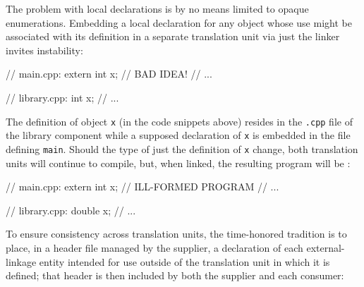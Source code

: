 The problem with local declarations is by no means limited to opaque
enumerations. Embedding a local declaration for any object whose use
might be associated with its definition in a separate translation unit
via just the linker invites instability:

\noindent\begin{minipage}{.45\textwidth}
\begin{emcppslisting}
// main.cpp:
extern int x;  // BAD IDEA!
// ...
\end{emcppslisting}
\end{minipage}\hfill
\begin{minipage}{.45\textwidth}
\begin{emcppslisting}
// library.cpp:
int x;
// ...
\end{emcppslisting}
\end{minipage}

\noindent The definition of object \lstinline!x! (in the code snippets above) resides
in the \lstinline!.cpp! file of the library component while a supposed
declaration of \lstinline!x! is embedded in the file defining
\lstinline!main!. Should the type of just the definition of \lstinline!x!
change, both translation units will continue to compile, but, when
linked, the resulting program will be :

\noindent\begin{minipage}{.65\textwidth}
\begin{emcppslisting}
// main.cpp:
extern int x;  // ILL-FORMED PROGRAM
// ...
\end{emcppslisting}
\end{minipage}\hfill
\begin{minipage}{.35\textwidth}
\begin{emcppslisting}
// library.cpp:
double x;
// ...
\end{emcppslisting}
\end{minipage}

\noindent To ensure consistency across translation units, the time-honored
tradition is to place, in a header file managed by the supplier, a
declaration of each external-linkage entity intended for use outside of
the translation unit in which it is defined; that header is then
included by both the supplier and each consumer:

